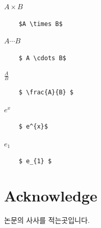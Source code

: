\documentclass[twocolumn, 10pt]{article}
\begin{document}
\begin{CJK}{UTF8}{}
$ A \times B$
\begin{verbatim}
    $A \times B$
\end{verbatim}

$ A \cdots B$
\begin{verbatim}
    $ A \cdots B$
\end{verbatim}

$ \frac{A}{B}$
\begin{verbatim}
    $ \frac{A}{B} $
\end{verbatim}

$ e^{x}$
\begin{verbatim}
    $ e^{x}$
\end{verbatim}

$ e_{1}$
\begin{verbatim}
    $ e_{1} $
\end{verbatim}

\section{Acknowledge}
논문의 사사를 적는곳입니다.


\end{CJK}

\medskip


\end{document}
